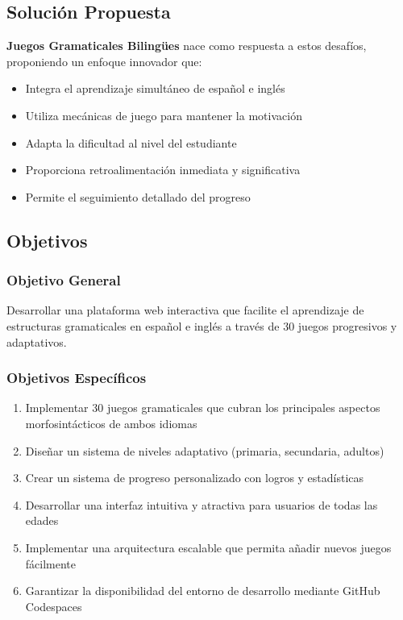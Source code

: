 \documentclass[12pt,a4paper]{article}
\begin{document}
\subsection{Solución Propuesta}

\textbf{Juegos Gramaticales Bilingües} nace como respuesta a estos desafíos, proponiendo un enfoque innovador que:
\begin{itemize}
    \item Integra el aprendizaje simultáneo de español e inglés
    \item Utiliza mecánicas de juego para mantener la motivación
    \item Adapta la dificultad al nivel del estudiante
    \item Proporciona retroalimentación inmediata y significativa
    \item Permite el seguimiento detallado del progreso
\end{itemize}

\subsection{Objetivos}

\subsubsection{Objetivo General}
Desarrollar una plataforma web interactiva que facilite el aprendizaje de estructuras gramaticales en español e inglés a través de 30 juegos progresivos y adaptativos.

\subsubsection{Objetivos Específicos}
\begin{enumerate}
    \item Implementar 30 juegos gramaticales que cubran los principales aspectos morfosintácticos de ambos idiomas
    \item Diseñar un sistema de niveles adaptativo (primaria, secundaria, adultos)
    \item Crear un sistema de progreso personalizado con logros y estadísticas
    \item Desarrollar una interfaz intuitiva y atractiva para usuarios de todas las edades
    \item Implementar una arquitectura escalable que permita añadir nuevos juegos fácilmente
    \item Garantizar la disponibilidad del entorno de desarrollo mediante GitHub Codespaces
\end{enumerate}
\end{document}
